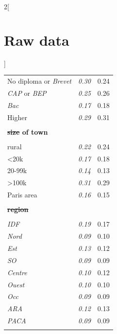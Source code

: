 \documentclass[12pt]{article} %
\providecommand{\DIFaddtex}[1]{{\protect\color{blue}\uwave{#1}}} %
\providecommand{\DIFdeltex}[1]{{\protect\color{red}\sout{#1}}}                      %
\providecommand{\DIFaddFL}[1]{\DIFadd{#1}} %
\providecommand{\DIFdelFL}[1]{\DIFdel{#1}} %
\providecommand{\DIFaddbeginFL}{} %
\providecommand{\DIFaddendFL}{} %
\providecommand{\DIFdelbeginFL}{} %
\providecommand{\DIFdelendFL}{} %
\providecommand{\DIFadd}[1]{\texorpdfstring{\DIFaddtex{#1}}{#1}} %
\providecommand{\DIFdel}[1]{\texorpdfstring{\DIFdeltex{#1}}{}} %
\newcommand{\DIFscaledelfig}{0.5}
\newlength{\DIFdelgraphicswidth} %
\newlength{\DIFdelgraphicsheight} %
\newcommand{\DIFaddincludegraphics}[2][]{{\color{blue}\fbox{\DIFOincludegraphics[#1]{#2}}}} %
\newcommand{\DIFdelincludegraphics}[2][]{%
\sbox{\DIFdelgraphicsbox}{\DIFOincludegraphics[#1]{#2}}%
\settoboxwidth{\DIFdelgraphicswidth}{\DIFdelgraphicsbox} %
\settoboxtotalheight{\DIFdelgraphicsheight}{\DIFdelgraphicsbox} %
\scalebox{\DIFscaledelfig}{%
\parbox[b]{\DIFdelgraphicswidth}{\usebox{\DIFdelgraphicsbox}\\[-\baselineskip] \rule{\DIFdelgraphicswidth}{0em}}\llap{\resizebox{\DIFdelgraphicswidth}{\DIFdelgraphicsheight}{%
\setlength{\unitlength}{\DIFdelgraphicswidth}%
\begin{picture}(1,1)%
\thicklines\linethickness{2pt} %
{\color[rgb]{1,0,0}\put(0,0){\framebox(1,1){}}}%
{\color[rgb]{1,0,0}\put(0,0){\line( 1,1){1}}}%
{\color[rgb]{1,0,0}\put(0,1){\line(1,-1){1}}}%
\end{picture}%
}\hspace*{3pt}}} %
} %
\DeclareRobustCommand{\DIFaddbeginFL}{\DIFOaddbeginFL \let\includegraphics\DIFaddincludegraphics} %
\DeclareRobustCommand{\DIFaddendFL}{\DIFOaddendFL \let\includegraphics\DIFOincludegraphics} %
\DeclareRobustCommand{\DIFdelbeginFL}{\DIFOdelbeginFL \let\includegraphics\DIFdelincludegraphics} %
\DeclareRobustCommand{\DIFdelendFL}{\DIFOaddendFL \let\includegraphics\DIFOincludegraphics} %
\begin{document}
\begin{appendices}
\begin{multicols}{2}[\section{Raw data\label{sec:Raw-Data}}]
\begin{table}[H]
\begin{tabular}{lcc}
No diploma or \emph{Brevet} & \emph{0.30} & 0.24\tabularnewline
\emph{CAP} or \emph{BEP} & \emph{0.25} & 0.26\tabularnewline
\emph{Bac} & \emph{0.17} & 0.18\tabularnewline
Higher & \emph{0.29} & 0.31\tabularnewline
\hline  \\[-1.8ex]
\textbf{\DIFdelbeginFL \DIFdelFL{size }\DIFdelendFL \DIFaddbeginFL \DIFaddFL{Size }\DIFaddendFL of town} &  & \tabularnewline  \\[-1.8ex]
rural & \emph{0.22} & 0.24\tabularnewline
<20k & \emph{0.17} & 0.18\tabularnewline
20-99k & \emph{0.14} & 0.13\tabularnewline
>100k & \emph{0.31} & 0.29\tabularnewline
Paris area & \emph{0.16} & 0.15\tabularnewline
\hline  \\[-1.8ex]
\textbf{\DIFdelbeginFL \DIFdelFL{region}\DIFdelendFL \DIFaddbeginFL \DIFaddFL{Region}\DIFaddendFL } &  & \tabularnewline  \\[-1.8ex]
\emph{IDF} & \emph{0.19} & 0.17\tabularnewline
 \emph{Nord} & \emph{0.09} & 0.10\tabularnewline
 \emph{Est} & \emph{0.13} & 0.12\tabularnewline
\emph{SO} & \emph{0.09} & 0.09\tabularnewline
\emph{Centre} & \emph{0.10} & 0.12\tabularnewline
 \emph{Ouest} & \emph{0.10} & 0.10\tabularnewline
 \emph{Occ} & \emph{0.09} & 0.09\tabularnewline
\emph{ARA} & \emph{0.12} & 0.13\tabularnewline
\emph{PACA} & \emph{0.09} & 0.09\tabularnewline  \\[-1.8ex]
\hline \hline 
\end{tabular}\bigskip{}
\end{table}



\end{multicols}
\end{appendices}
\end{document}
